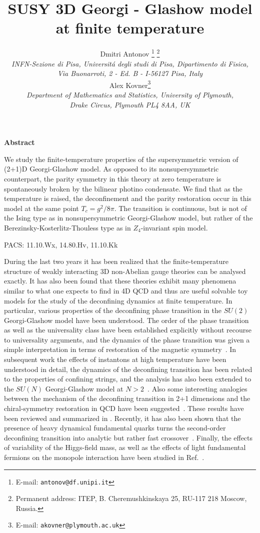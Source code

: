 \documentclass[a4paper,12pt]{article}
\title{
\vspace{-3mm} \rightline{\small IFUP-TH 2003/15} \vspace{8mm} \bf
SUSY 3D Georgi - Glashow model at finite temperature}
\author{
Dmitri Antonov \thanks{
E-mail: {\tt antonov@df.unipi.it}}
\thanks{Permanent address:
ITEP, B. Cheremushkinskaya 25, RU-117 218 Moscow, Russia.}\\
{\it INFN-Sezione di Pisa, Universit\'a degli studi di Pisa,
Dipartimento di Fisica,}\\
{\it Via Buonarroti, 2 - Ed. B - I-56127 Pisa, Italy}\\
Alex Kovner\thanks{ E-mail: {\tt akovner@plymouth.ac.uk}} \\{\it
Department of Mathematics and Statistics, University of
Plymouth,}\\{\it Drake Circus, Plymouth PL4 8AA, UK}}
\date{}
\begin{document}

\maketitle \vspace{1mm} \centerline{\bf {Abstract}} \vspace{3mm}
\noindent We study the finite-temperature properties of the
supersymmetric version of (2+1)D Georgi-Glashow model. As
opposed to its nonsupersymmetric counterpart, the parity symmetry
in this theory at zero temperature is spontaneously broken by the
 bilinear photino condensate. We find that as the temperature is
raised, the deconfinement and the parity restoration occur in this
model at the same point $T_c=g^2/8\pi$.  The transition is
continuous, but is not of the Ising type as in nonsupersymmetric
Georgi-Glashow model, but rather of the
Berezinsky-Kosterlitz-Thouless type as in $Z_4$-invariant spin
model.




\vspace{5mm}
\noindent
PACS: 11.10.Wx, 14.80.Hv, 11.10.Kk


\newpage

During the last two years it has been realized that the
finite-temperature structure of weakly interacting 3D non-Abelian gauge
theories can be analysed exactly. It has also been found that these
theories exhibit many phenomena similar to what one expects to
find in 4D QCD and thus are useful solvable toy models for the
study of the deconfining dynamics at finite temperature. In
particular, various properties of the deconfining phase transition
in the $SU(2)$ Georgi-Glashow model have been understood. The
order of the phase transition as well as the universality class
have been established explicitly without recourse to universality
arguments, and the dynamics of the phase transition was given a
simple interpretation in terms of restoration of the magnetic symmetry~\cite{2}.
In subsequent work the effects of instantons at high
temperature have been understood in detail, the dynamics of the
deconfining transition has been related to the properties of
confining strings, and the analysis has also been extended to the
$SU(N)$ Georgi-Glashow model at $N>2$~\cite{gg2}.  Also some
interesting analogies between the mechanism of the deconfining
transition in 2+1 dimensions and the chiral-symmetry restoration
in QCD have been suggested~\cite{gg3}. These results have been
reviewed and summarized in \cite{kk}. Recently, it has also
been shown that the presence of heavy dynamical fundamental quarks
turns the second-order deconfining transition into analytic but
rather fast crossover~\cite{dkn}. Finally, the
effects of variability of the Higgs-field mass, as well as the effects of
light fundamental fermions on the monopole interaction have been studied in Ref.~\cite{antonov}.
\end{document}

